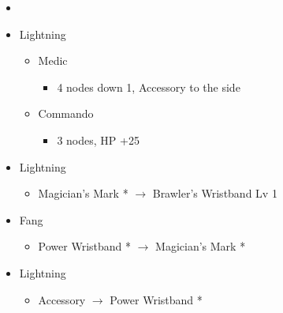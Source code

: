 \begin{paracol}{2}
	\begin{menu}
		\begin{itemize}
			\paradigm
			\begin{itemize}
				\item {}%
				      {\paradigmline{\com}{\com}{\rav}}%
				      {\paradigmline{\rav}{\com}{\rav}}%
				      {\paradigmline{(\com)}{(\com)}{\rav}}%
				      {\paradigmline{(\com)}{(\com)}{(\med)}}%
				      {\paradigmline[5]{\textit{(\com)}}{\textit{(\com)}}{\textit{\syn}}}%
				      {\paradigmline{(\com)}{\com}{(\med)}}
			\end{itemize}
			\crystarium
			\begin{itemize}
				\item Lightning
				      \begin{itemize}
					      \item Medic
					            \begin{itemize}
						            \item 4 nodes down 1, Accessory to the side
					            \end{itemize}
					      \item Commando
					            \begin{itemize}
						            \item 3 nodes, HP +25
					            \end{itemize}
				      \end{itemize}
			\end{itemize}
			\equip
			\begin{itemize}
				\item Lightning
				      \begin{itemize}
					      \item Magician's Mark * $\rightarrow$ Brawler's Wristband Lv 1
				      \end{itemize}
				\item Fang
				      \begin{itemize}
					      \item Power Wristband * $\rightarrow$ Magician's Mark *
				      \end{itemize}
				\item Lightning
				      \begin{itemize}
					      \item Accessory $\rightarrow$ Power Wristband *
				      \end{itemize}
			\end{itemize}
		\end{itemize}
	\end{menu}


\end{paracol}
